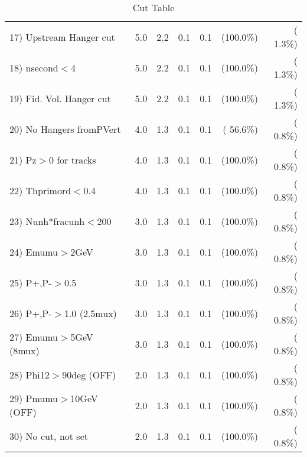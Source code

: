 \begin{table}[h!]
\begin{tabular}{||l||r|r|r|r|r|r||}
 17) Upstream Hanger cut  &          5.0 &          2.2 &          0.1 &          0.1 & (100.0\%) & (  1.3\%) \\
 18) nsecond$<$4          &          5.0 &          2.2 &          0.1 &          0.1 & (100.0\%) & (  1.3\%) \\
 19) Fid. Vol. Hanger cut &          5.0 &          2.2 &          0.1 &          0.1 & (100.0\%) & (  1.3\%) \\
 20) No Hangers fromPVert &          4.0 &          1.3 &          0.1 &          0.1 & ( 56.6\%) & (  0.8\%) \\
 21) Pz$>$0 for tracks    &          4.0 &          1.3 &          0.1 &          0.1 & (100.0\%) & (  0.8\%) \\
 22) Thprimord$<$0.4      &          4.0 &          1.3 &          0.1 &          0.1 & (100.0\%) & (  0.8\%) \\
 23) Nunh*fracunh$<$200   &          3.0 &          1.3 &          0.1 &          0.1 & (100.0\%) & (  0.8\%) \\
 24) Emumu$>$2GeV         &          3.0 &          1.3 &          0.1 &          0.1 & (100.0\%) & (  0.8\%) \\
 25) P+,P-$>$0.5          &          3.0 &          1.3 &          0.1 &          0.1 & (100.0\%) & (  0.8\%) \\
 26) P+,P-$>$1.0 (2.5mux) &          3.0 &          1.3 &          0.1 &          0.1 & (100.0\%) & (  0.8\%) \\
 27) Emumu$>$5GeV  (8mux) &          3.0 &          1.3 &          0.1 &          0.1 & (100.0\%) & (  0.8\%) \\
 28) Phi12$>$90deg  (OFF) &          2.0 &          1.3 &          0.1 &          0.1 & (100.0\%) & (  0.8\%) \\
 29) Pmumu$>$10GeV  (OFF) &          2.0 &          1.3 &          0.1 &          0.1 & (100.0\%) & (  0.8\%) \\
 30) No cut, not set      &          2.0 &          1.3 &          0.1 &          0.1 & (100.0\%) & (  0.8\%) \\
 \hline
 \hline
 \end{tabular}
 \caption{Cut Table           }
 \label{tab-cutcohjpsi-mumu_cohphi0}
 \end{table}
